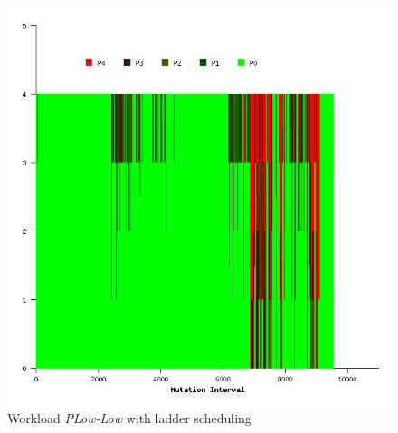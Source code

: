 \begin{figure}
  \begin{center}
    \includegraphics[scale=0.4]{figures/mutation_timeline_figures/mut_t1/PLow-Low/125_4.jpeg}%
    \caption{Workload \textit{PLow-Low} with ladder scheduling}
    \label{fig:wrk_plowlow_ladder}
  \end{center}
\end{figure}

